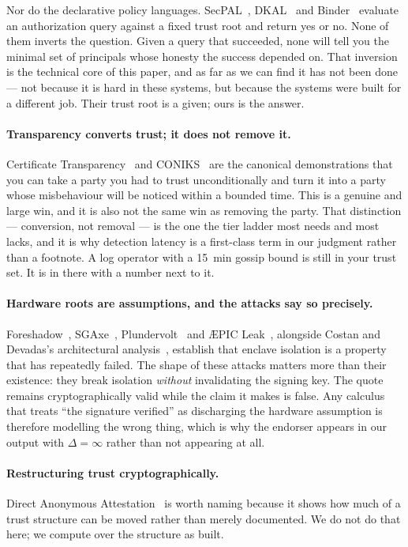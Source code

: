 \documentclass[11pt]{article}
\newcommand{\Never}{\infty}
\begin{document}
Nor do the declarative policy languages. SecPAL~\cite{secpal},
DKAL~\cite{dkal} and Binder~\cite{binder} evaluate an authorization query
against a fixed trust root and return yes or no. None of them inverts the
question. Given a query that succeeded, none will tell you the minimal set of
principals whose honesty the success depended on. That inversion is the
technical core of this paper, and as far as we can find it has not been done
--- not because it is hard in these systems, but because the systems were
built for a different job. Their trust root is a given; ours is the answer.

\paragraph{Transparency converts trust; it does not remove it.} Certificate
Transparency~\cite{rfc6962,rfc9162} and CONIKS~\cite{coniks} are the canonical
demonstrations that you can take a party you had to trust unconditionally and
turn it into a party whose misbehaviour will be noticed within a bounded time.
This is a genuine and large win, and it is also not the same win as removing
the party. That distinction --- conversion, not removal --- is the one the
tier ladder most needs and most lacks, and it is why detection latency is a
first-class term in our judgment rather than a footnote. A log operator with
a \SI{15}{\minute} gossip bound is still in your trust set. It is in there with
a number next to it.

\paragraph{Hardware roots are assumptions, and the attacks say so
precisely.} Foreshadow~\cite{foreshadow}, SGAxe~\cite{sgaxe},
Plundervolt~\cite{plundervolt} and \AE{}PIC Leak~\cite{aepic}, alongside
Costan and Devadas's architectural analysis~\cite{costan2016}, establish that
enclave isolation is a property that has repeatedly failed. The shape of these
attacks matters more than their existence: they break isolation \emph{without}
invalidating the signing key. The quote remains cryptographically valid while
the claim it makes is false. Any calculus that treats ``the signature
verified'' as discharging the hardware assumption is therefore modelling the
wrong thing, which is why the endorser appears in our output with
$\Delta = \Never$ rather than not appearing at all.

\paragraph{Restructuring trust cryptographically.} Direct Anonymous
Attestation~\cite{daa} is worth naming because it shows how much of a trust
structure can be moved rather than merely documented. We do not do that here;
we compute over the structure as built.
\end{document}

